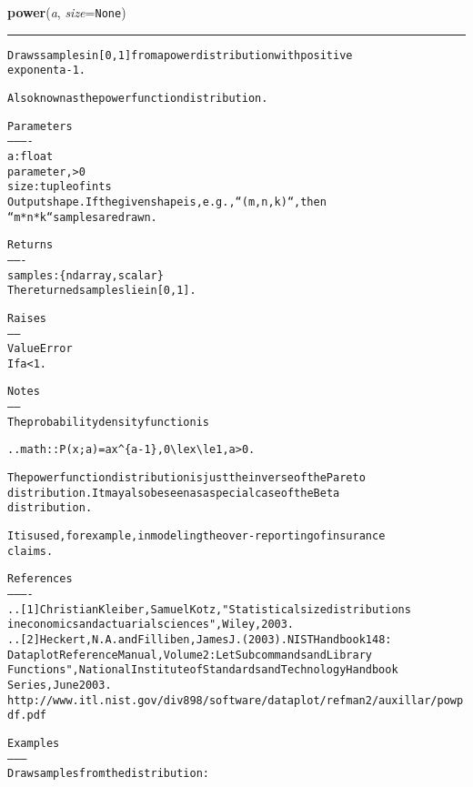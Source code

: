     \label{trunk:qstkutil:bollinger:power}

    \vspace{0.5ex}

\hspace{.8\funcindent}\begin{boxedminipage}{\funcwidth}

    \raggedright \textbf{power}(\textit{a}, \textit{size}={\tt None})

    \vspace{-1.5ex}

    \rule{\textwidth}{0.5\fboxrule}
\setlength{\parskip}{2ex}
\begin{alltt}
Draws samples in [0, 1] from a power distribution with positive
exponent a - 1.

Also known as the power function distribution.

Parameters
----------
a : float
    parameter, {\textgreater} 0
size : tuple of ints
    Output shape.  If the given shape is, e.g., ``(m, n, k)``, then
            ``m * n * k`` samples are drawn.

Returns
-------
samples : \{ndarray, scalar\}
    The returned samples lie in [0, 1].

Raises
------
ValueError
    If a{\textless}1.

Notes
-----
The probability density function is

.. math:: P(x; a) = ax{\textasciicircum}\{a-1\}, 0 {\textbackslash}le x {\textbackslash}le 1, a{\textgreater}0.

The power function distribution is just the inverse of the Pareto
distribution. It may also be seen as a special case of the Beta
distribution.

It is used, for example, in modeling the over-reporting of insurance
claims.

References
----------
.. [1] Christian Kleiber, Samuel Kotz, "Statistical size distributions
       in economics and actuarial sciences", Wiley, 2003.
.. [2] Heckert, N. A. and Filliben, James J. (2003). NIST Handbook 148:
       Dataplot Reference Manual, Volume 2: Let Subcommands and Library
       Functions", National Institute of Standards and Technology Handbook
       Series, June 2003.
       http://www.itl.nist.gov/div898/software/dataplot/refman2/auxillar/powpdf.pdf

Examples
--------
Draw samples from the distribution:


\end{alltt}
\end{boxedminipage}

